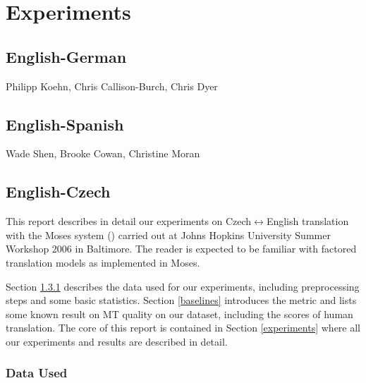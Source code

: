 \documentclass[10pt]{report}
\theoremstyle{plain}
\begin{document}
{%

\chapter{Experiments}

\section{English-German}
{\sc Philipp Koehn, Chris Callison-Burch, Chris Dyer}
\section{English-Spanish}
{\sc Wade Shen, Brooke Cowan, Christine Moran}

\section{English-Czech}
{  %


\def\clap#1{\hbox to 0pt{\hss #1\hss}}
\def\equo#1{``#1''}
\def\ang#1{{$\langle${#1}$\rangle$}}  %
\def\text#1{{\it{}#1}}


\def\bidir{Czech$\leftrightarrow$English}
\def\tocs{English$\rightarrow$Czech}
\def\toen{Czech$\rightarrow$English}
\def\parcite#1{(\cite{#1})}
\def\perscite#1{\cite{#1}} %

\def\max#1{{\bf{} #1}}
\def\stddev#1{{$\pm$#1}}


\def\subsubsubsection#1{{\bf #1\\}}


This report describes in detail our experiments on \bidir{} translation
with the Moses system \parcite{moses} carried out at Johns Hopkins University
Summer Workshop 2006 in Baltimore. The reader is expected to be
familiar with factored translation models as implemented in Moses.

Section \ref{data} describes the data used for our experiments, including
preprocessing steps and some basic statistics. Section \ref{baselines}
introduces the metric and lists some known result on MT quality on our
dataset, including the scores of human translation. The core of this report is
contained in Section \ref{experiments} where all our experiments and results are
described in detail.




\subsection{Data Used}
\label{data}




}}
\end{document}
